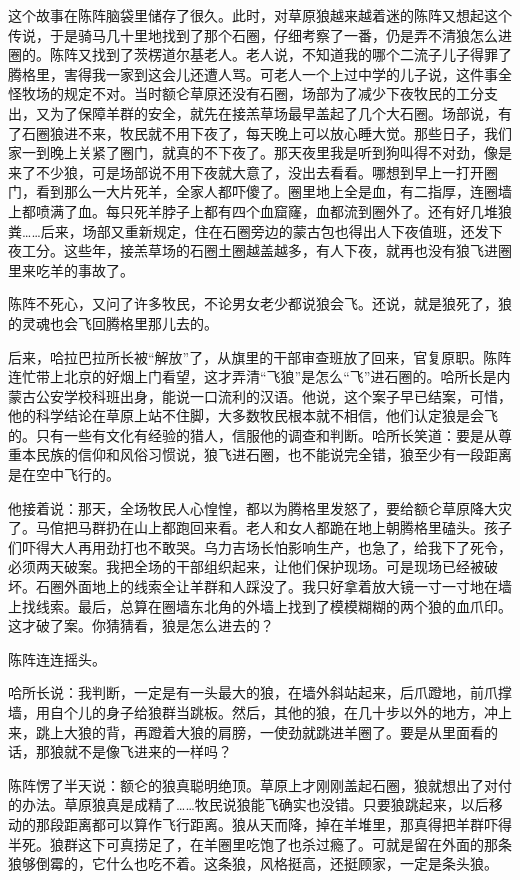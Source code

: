 \par 这个故事在陈阵脑袋里储存了很久。此时，对草原狼越来越着迷的陈阵又想起这个传说，于是骑马几十里地找到了那个石圈，仔细考察了一番，仍是弄不清狼怎么进圈的。陈阵又找到了茨楞道尔基老人。老人说，不知道我的哪个二流子儿子得罪了腾格里，害得我一家到这会儿还遭人骂。可老人一个上过中学的儿子说，这件事全怪牧场的规定不对。当时额仑草原还没有石圈，场部为了减少下夜牧民的工分支出，又为了保障羊群的安全，就先在接羔草场最早盖起了几个大石圈。场部说，有了石圈狼进不来，牧民就不用下夜了，每天晚上可以放心睡大觉。那些日子，我们家一到晚上关紧了圈门，就真的不下夜了。那天夜里我是听到狗叫得不对劲，像是来了不少狼，可是场部说不用下夜就大意了，没出去看看。哪想到早上一打开圈门，看到那么一大片死羊，全家人都吓傻了。圈里地上全是血，有二指厚，连圈墙上都喷满了血。每只死羊脖子上都有四个血窟窿，血都流到圈外了。还有好几堆狼粪……后来，场部又重新规定，住在石圈旁边的蒙古包也得出人下夜值班，还发下夜工分。这些年，接羔草场的石圈土圈越盖越多，有人下夜，就再也没有狼飞进圈里来吃羊的事故了。
\par 陈阵不死心，又问了许多牧民，不论男女老少都说狼会飞。还说，就是狼死了，狼的灵魂也会飞回腾格里那儿去的。
\par 后来，哈拉巴拉所长被“解放”了，从旗里的干部审查班放了回来，官复原职。陈阵连忙带上北京的好烟上门看望，这才弄清“飞狼”是怎么“飞”进石圈的。哈所长是内蒙古公安学校科班出身，能说一口流利的汉语。他说，这个案子早已结案，可惜，他的科学结论在草原上站不住脚，大多数牧民根本就不相信，他们认定狼是会飞的。只有一些有文化有经验的猎人，信服他的调查和判断。哈所长笑道：要是从尊重本民族的信仰和风俗习惯说，狼飞进石圈，也不能说完全错，狼至少有一段距离是在空中飞行的。
\par 他接着说：那天，全场牧民人心惶惶，都以为腾格里发怒了，要给额仑草原降大灾了。马倌把马群扔在山上都跑回来看。老人和女人都跪在地上朝腾格里磕头。孩子们吓得大人再用劲打也不敢哭。乌力吉场长怕影响生产，也急了，给我下了死令，必须两天破案。我把全场的干部组织起来，让他们保护现场。可是现场已经被破坏。石圈外面地上的线索全让羊群和人踩没了。我只好拿着放大镜一寸一寸地在墙上找线索。最后，总算在圈墙东北角的外墙上找到了模模糊糊的两个狼的血爪印。这才破了案。你猜猜看，狼是怎么进去的？
\par 陈阵连连摇头。
\par 哈所长说：我判断，一定是有一头最大的狼，在墙外斜站起来，后爪蹬地，前爪撑墙，用自个儿的身子给狼群当跳板。然后，其他的狼，在几十步以外的地方，冲上来，跳上大狼的背，再蹬着大狼的肩膀，一使劲就跳进羊圈了。要是从里面看的话，那狼就不是像飞进来的一样吗？
\par 陈阵愣了半天说：额仑的狼真聪明绝顶。草原上才刚刚盖起石圈，狼就想出了对付的办法。草原狼真是成精了……牧民说狼能飞确实也没错。只要狼跳起来，以后移动的那段距离都可以算作飞行距离。狼从天而降，掉在羊堆里，那真得把羊群吓得半死。狼群这下可真捞足了，在羊圈里吃饱了也杀过瘾了。可就是留在外面的那条狼够倒霉的，它什么也吃不着。这条狼，风格挺高，还挺顾家，一定是条头狼。
